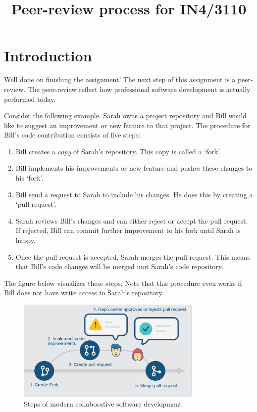 \documentclass[a4paper]{article}
\title{Peer-review process for IN4/3110}
\begin{document}
\maketitle

\section{Introduction}

Well done on finishing the assignment!
The next step of this assignment is a peer-review. The peer-review reflect how professional software development is actually performed today. 

Consider the following example. Sarah owns a project repository and Bill would like to suggest an improvement or new feature to that project. The procedure for Bill's code contribution consists of five steps:
\begin{enumerate}
\item Bill creates a \emph{copy} of Sarah's repository. This copy is called a `fork'.
\item Bill implements his improvements or new feature and pushes these changes to his `fork'.
\item Bill send a request to Sarah to include his changes. He does this by creating a `pull request'.
\item Sarah reviews Bill's changes and can either reject or accept the pull request. If rejected, Bill can commit further improvement to his fork until Sarah is happy.
\item Once the pull request is accepted, Sarah merges the pull request. This means that Bill's code changes will be merged inot Sarah's code repository.
\end{enumerate}

The figure below visualizes these steps. Note that this procedure even works if Bill does not have write access to Sarah's repository.

\begin{figure}[h!]
\centering
\includegraphics[width=0.8\textwidth]{collaboration.png}
\caption{Steps of modern collaborative software development}\label{fig:steps}
\end{figure}
\end{document}
